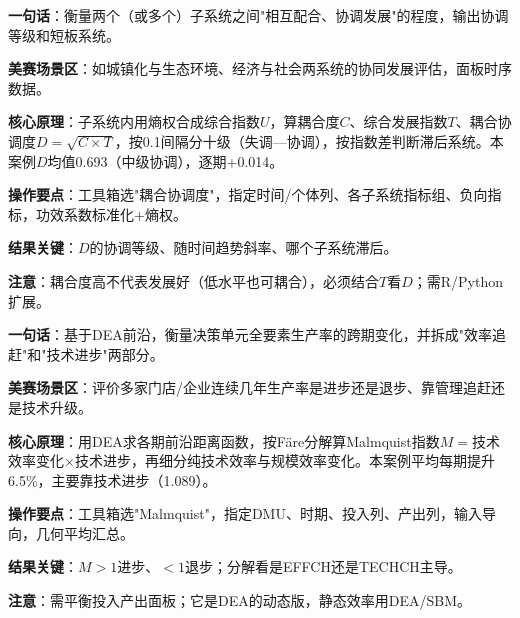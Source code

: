 
\begin{algobrief}
\textbf{一句话}：衡量两个（或多个）子系统之间"相互配合、协调发展"的程度，输出协调等级和短板系统。

\textbf{美赛场景区}：如城镇化与生态环境、经济与社会两系统的协同发展评估，面板时序数据。

\textbf{核心原理}：子系统内用熵权合成综合指数$U$，算耦合度$C$、综合发展指数$T$、耦合协调度$D=\sqrt{C\times T}$，按0.1间隔分十级（失调—协调），按指数差判断滞后系统。本案例$D$均值0.693（中级协调），逐期+0.014。

\textbf{操作要点}：工具箱选"耦合协调度"，指定时间/个体列、各子系统指标组、负向指标，功效系数标准化+熵权。

\textbf{结果关键}：$D$的协调等级、随时间趋势斜率、哪个子系统滞后。

\textbf{注意}：耦合度高不代表发展好（低水平也可耦合），必须结合$T$看$D$；需R/Python扩展。
\end{algobrief}


\begin{algobrief}
\textbf{一句话}：基于DEA前沿，衡量决策单元全要素生产率的跨期变化，并拆成"效率追赶"和"技术进步"两部分。

\textbf{美赛场景区}：评价多家门店/企业连续几年生产率是进步还是退步、靠管理追赶还是技术升级。

\textbf{核心原理}：用DEA求各期前沿距离函数，按Färe分解算Malmquist指数$M=$技术效率变化$\times$技术进步，再细分纯技术效率与规模效率变化。本案例平均每期提升6.5\%，主要靠技术进步（1.089）。

\textbf{操作要点}：工具箱选"Malmquist"，指定DMU、时期、投入列、产出列，输入导向，几何平均汇总。

\textbf{结果关键}：$M>1$进步、$<1$退步；分解看是EFFCH还是TECHCH主导。

\textbf{注意}：需平衡投入产出面板；它是DEA的动态版，静态效率用DEA/SBM。
\end{algobrief}


